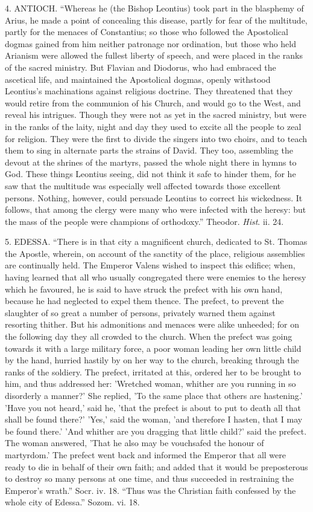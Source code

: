 4. ANTIOCH. ``Whereas he (the Bishop
Leontius) took part in the blasphemy of Arius, he made a point of
concealing this disease, partly for fear of the multitude, partly for
the menaces of Constantius; so those who followed the Apostolical
dogmas gained from him neither patronage nor ordination, but those who
held Arianism were allowed the fullest liberty of speech, and were
placed in the ranks of the sacred ministry. But Flavian and Diodorus,
who had embraced the ascetical life, and maintained the Apostolical
dogmas, openly withstood Leontius's machinations against religious
doctrine. They threatened that they would retire from the communion of
his Church, and would go to the West, and reveal his intrigues. Though
they were not as yet in the sacred ministry, but were in the ranks of
the laity, night and day they used to excite all the people to zeal
for religion. They were the first to divide the singers into two
choirs, and to teach them to sing in alternate parts the strains of
David. They too, assembling the devout at the shrines of the martyrs,
passed the whole night there in hymns to God. These things Leontius
seeing, did not think it safe to hinder them, for he saw that the
multitude was especially well affected towards those excellent
persons. Nothing, however, could persuade Leontius to correct
his wickedness. It follows, that among the clergy were many who were
infected with the heresy: but the mass of the people were champions of
orthodoxy.'' Theodor. \emph{Hist}. ii. 24.

5. EDESSA. ``There is in that city a
magnificent church, dedicated to St. Thomas the Apostle, wherein, on
account of the sanctity of the place, religious assemblies are
continually held. The Emperor Valens wished to inspect this edifice;
when, having learned that all who usually congregated there were
enemies to the heresy which he favoured, he is said to have struck the
prefect with his own hand, because he had neglected to expel them
thence. The prefect, to prevent the slaughter of so great a number of
persons, privately warned them against resorting thither. But his
admonitions and menaces were alike unheeded; for on the following day
they all crowded to the church. When the prefect was going towards it
with a large military force, a poor woman leading her own little child
by the hand, hurried hastily by on her way to the church, breaking
through the ranks of the soldiery. The prefect, irritated at this,
ordered her to be brought to him, and thus addressed her: 'Wretched
woman, whither are you running in so disorderly a manner?' She
replied, 'To the same place that others are hastening.' 'Have you not
heard,' said he, 'that the prefect is about to put to death all that
shall be found there?' 'Yes,' said the woman, 'and therefore I hasten,
that I may be found there.' 'And whither are you dragging that little
child?' said the prefect. The woman answered, 'That he also may be
vouchsafed the honour of martyrdom.' The prefect went back and
informed the Emperor that all were ready to die in behalf of their own
faith; and added that it would be preposterous to destroy so many
persons at one time, and thus succeeded in restraining the Emperor's
wrath.'' Socr. iv. 18. ``Thus was the Christian faith
confessed by the whole city of Edessa.'' Sozom. vi. 18.

